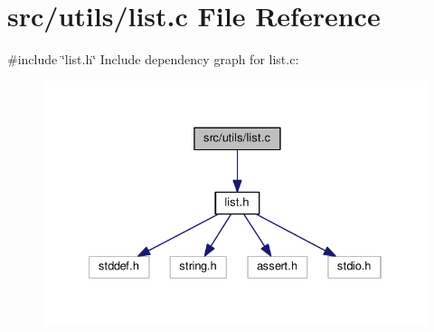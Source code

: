 \section{src/utils/list.c File Reference}
\label{list_8c}
{\ttfamily \#include \char`\"{}list.\+h\char`\"{}}\newline
Include dependency graph for list.\+c\+:
\nopagebreak
\begin{figure}[H]
\begin{center}
\leavevmode
\includegraphics[width=334pt]{list_8c__incl}
\end{center}
\end{figure}
